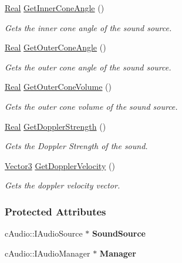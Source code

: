 \begin{DoxyCompactItemize}
\hyperlink{namespacephys_af7eb897198d265b8e868f45240230d5f}{Real} \hyperlink{classphys_1_1Sound_a5e39752133cd5d8d160455bbbcb360fd}{GetInnerConeAngle} ()
\begin{DoxyCompactList}\small\item\em Gets the inner cone angle of the sound source. \item\end{DoxyCompactList}\item 
\hyperlink{namespacephys_af7eb897198d265b8e868f45240230d5f}{Real} \hyperlink{classphys_1_1Sound_ad39ca4504655a777283fd2e238b729d1}{GetOuterConeAngle} ()
\begin{DoxyCompactList}\small\item\em Gets the outer cone angle of the sound source. \item\end{DoxyCompactList}\item 
\hyperlink{namespacephys_af7eb897198d265b8e868f45240230d5f}{Real} \hyperlink{classphys_1_1Sound_a2607037d0c40d32f402d0ebb98586a00}{GetOuterConeVolume} ()
\begin{DoxyCompactList}\small\item\em Gets the outer cone volume of the sound source. \item\end{DoxyCompactList}\item 
\hyperlink{namespacephys_af7eb897198d265b8e868f45240230d5f}{Real} \hyperlink{classphys_1_1Sound_a894e1390d76c6a6e79404569afeaf168}{GetDopplerStrength} ()
\begin{DoxyCompactList}\small\item\em Gets the Doppler Strength of the sound. \item\end{DoxyCompactList}\item 
\hyperlink{classphys_1_1Vector3}{Vector3} \hyperlink{classphys_1_1Sound_a9d4e845004b59ba5bdc066f7f12ff7d7}{GetDopplerVelocity} ()
\begin{DoxyCompactList}\small\item\em Gets the doppler velocity vector. \item\end{DoxyCompactList}\end{DoxyCompactItemize}
\subsubsection*{Protected Attributes}
\begin{DoxyCompactItemize}
\item 
\hypertarget{classphys_1_1Sound_a7cd63202ea3dbc96c6f466a60b89b0fe}{
cAudio::IAudioSource $\ast$ {\bfseries SoundSource}}
\label{classphys_1_1Sound_a7cd63202ea3dbc96c6f466a60b89b0fe}

\item 
\hypertarget{classphys_1_1Sound_a84b31e91bd1363ba430a51f579a07e0b}{
cAudio::IAudioManager $\ast$ {\bfseries Manager}}
\label{classphys_1_1Sound_a84b31e91bd1363ba430a51f579a07e0b}

\end{DoxyCompactItemize}
